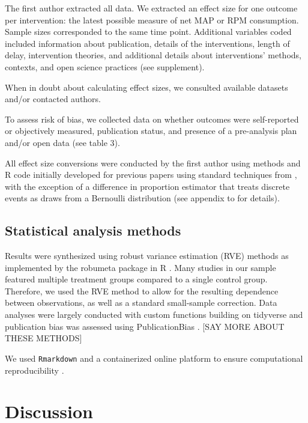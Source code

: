\documentclass[sn-nature,referee,pdflatex]{sn-jnl}
\begin{document}
The first author extracted all data. We extracted an effect size for one
outcome per intervention: the latest possible measure of net MAP or RPM
consumption. Sample sizes corresponded to the same time point.
Additional variables coded included information about publication,
details of the interventions, length of delay, intervention theories,
and additional details about interventions' methods, contexts, and open
science practices (see supplement).

When in doubt about calculating effect sizes, we consulted available
datasets and/or contacted authors.

To assess risk of bias, we collected data on whether outcomes were
self-reported or objectively measured, publication status, and presence
of a pre-analysis plan and/or open data (see table 3).

All effect size conversions were conducted by the first author using
methods and R code initially developed for previous papers
\citep{paluck2019, paluck2021, porat2024} using standard techniques from
\citep{cooper2019}, with the exception of a difference in proportion
estimator that treats discrete events as draws from a Bernoulli
distribution (see appendix to \citep{paluck2021} for details).

\subsection{Statistical analysis methods}\label{sec3.4}

Results were synthesized using robust variance estimation (RVE) methods
\citep{hedges2010} as implemented by the robumeta package
\citep{fisher2015} in R \citep{Rlang}. Many studies in our sample
featured multiple treatment groups compared to a single control group.
Therefore, we used the RVE method to allow for the resulting dependence
between observations, as well as a standard small-sample correction.
Data analyses were largely conducted with custom functions building on
tidyverse \citep{wickham2019} and publication bias was assessed using
PublicationBias \citep{mathur2024, mathur2020}. {[}SAY MORE ABOUT THESE
METHODS{]}

We used \texttt{Rmarkdown} \citep{xie2018} and a containerized
\citep{moreau2023} online platform \citep{clyburne2019} to ensure
computational reproducibility \citep{polanin2020}.

\section{Discussion}\label{discussion}
\end{document}

